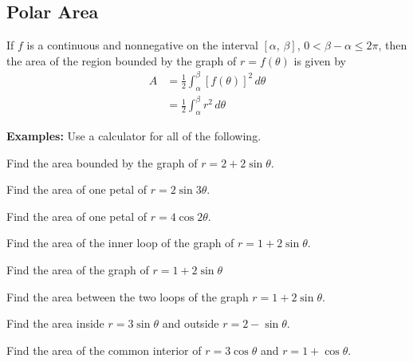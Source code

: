 \documentclass[addpoints, 12pt]{exam}
\begin{document}
\newpage
{}
\subsection*{Polar Area}
\begin{tcolorbox}[title= AREA IN POLAR FORM ,colframe=black,sharp corners,colback=white,colbacktitle=white,coltitle=black]

    If $f$ is a continuous and nonnegative on the interval $[\alpha,\,\beta]$, $0<\beta-\alpha\le2\pi$, then the area of the region bounded by the graph of $r=f(\theta)$ is given by
    \begin{align*}
        A   &= \frac{1}{2}\int_\alpha^\beta[f(\theta)]^2\,d\theta\\
            &= \frac{1}{2}\int_\alpha^\beta r^2\,d\theta
    \end{align*}
    
\end{tcolorbox}
\vspace{.1cm}
\noindent\textbf{Examples:} Use a calculator for all of the following.
\begin{questions}
    \question Find the area bounded by the graph of $r=2+2\sin\theta.$
    
    \question Find the area of one petal of $r=2\sin3\theta$.
    
    \question Find the area of one petal of $r=4\cos2\theta$.
    
    \newpage
    
    \question Find the area of the inner loop of the graph of $r=1+2\sin\theta$.
    
    \question Find the area of the graph of $r=1+2\sin\theta$
    
    \question Find the area between the two loops of the graph $r=1+2\sin\theta$.
    
    \newpage
    
    \question Find the area inside $r=3\sin\theta$ and outside $r=2-\sin\theta$.
    
    \question Find the area of the common interior of $r=3\cos\theta$ and $r=1+\cos\theta$.
\end{questions}
\end{document}
